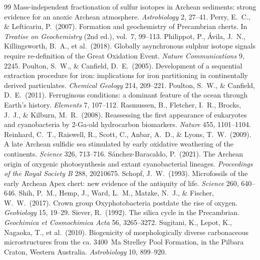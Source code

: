 \documentclass[11pt]{article}
\begin{document}
\begin{thebibliography}{99}
Mass-independent fractionation of sulfur isotopes in Archean sediments: strong evidence for an anoxic
Archean atmosphere. \textit{Astrobiology} 2, 27--41.
 Perry, E.~C., \& Lefticariu, P.\ (2007). Formation and
geochemistry of Precambrian cherts. In \textit{Treatise on Geochemistry} (2nd ed.), vol.~7, 99--113.
 Philippot, P., \'{A}vila, J.~N., Killingsworth, B.~A.,
et al.\ (2018). Globally asynchronous sulphur isotope signals require re-definition of the Great
Oxidation Event. \textit{Nature Communications} 9, 2245.
 Poulton, S.~W., \& Canfield, D.~E.\ (2005).
Development of a sequential extraction procedure for iron: implications for iron partitioning in
continentally derived particulates. \textit{Chemical Geology} 214, 209--221.
 Poulton, S.~W., \& Canfield, D.~E.\ (2011).
Ferruginous conditions: a dominant feature of the ocean through Earth's history. \textit{Elements} 7,
107--112.
 Rasmussen, B., Fletcher, I.~R., Brocks, J.~J., \&
Kilburn, M.~R.\ (2008). Reassessing the first appearance of eukaryotes and cyanobacteria by
2-Ga-old hydrocarbon biomarkers. \textit{Nature} 455, 1101--1104.
 Reinhard, C.~T., Raiswell, R., Scott, C., Anbar, A.~D.,
\& Lyons, T.~W.\ (2009). A late Archean sulfidic sea stimulated by early oxidative weathering of the
continents. \textit{Science} 326, 713--716.
 S\'{a}nchez-Baracaldo, P.\ (2021). The Archean
origin of oxygenic photosynthesis and extant cyanobacterial lineages. \textit{Proceedings of the
Royal Society B} 288, 20210675.
 Schopf, J.~W.\ (1993). Microfossils of the early Archean Apex
chert: new evidence of the antiquity of life. \textit{Science} 260, 640--646.
 Shih, P.~M., Hemp, J., Ward, L.~M., Matzke, N.~J., \& Fischer,
W.~W.\ (2017). Crown group Oxyphotobacteria postdate the rise of oxygen. \textit{Geobiology} 15,
19--29.
 Siever, R.\ (1992). The silica cycle in the Precambrian.
\textit{Geochimica et Cosmochimica Acta} 56, 3265--3272.
 Sugitani, K., Lepot, K., Nagaoka, T., et al.\ (2010).
Biogenicity of morphologically diverse carbonaceous microstructures from the ca. 3400~Ma Strelley
Pool Formation, in the Pilbara Craton, Western Australia. \textit{Astrobiology} 10, 899--920.

\end{thebibliography}
\end{document}
